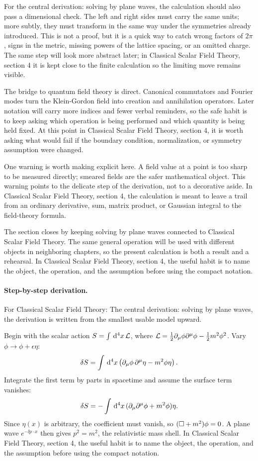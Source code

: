 For the central derivation: solving by plane waves, the calculation should also pass a dimensional check.  The left and right sides must carry the same units; more subtly, they must transform in the same way under the symmetries already introduced.  This is not a proof, but it is a quick way to catch wrong factors of \(2\pi\), signs in the metric, missing powers of the lattice spacing, or an omitted charge.  The same step will look more abstract later; in Classical Scalar Field Theory, section 4 it is kept close to the finite calculation so the limiting move remains visible.

The bridge to quantum field theory is direct.  Canonical commutators and Fourier modes turn the Klein-Gordon field into creation and annihilation operators.  Later notation will carry more indices and fewer verbal reminders, so the safe habit is to keep asking which operation is being performed and which quantity is being held fixed.  At this point in Classical Scalar Field Theory, section 4, it is worth asking what would fail if the boundary condition, normalization, or symmetry assumption were changed.

One warning is worth making explicit here.  A field value at a point is too sharp to be measured directly; smeared fields are the safer mathematical object.  This warning points to the delicate step of the derivation, not to a decorative aside.  In Classical Scalar Field Theory, section 4, the calculation is meant to leave a trail from an ordinary derivative, sum, matrix product, or Gaussian integral to the field-theory formula.

The section closes by keeping solving by plane waves connected to Classical Scalar Field Theory.  The same general operation will be used with different objects in neighboring chapters, so the present calculation is both a result and a rehearsal.  In Classical Scalar Field Theory, section 4, the useful habit is to name the object, the operation, and the assumption before using the compact notation.



\paragraph{Step-by-step derivation.}

For Classical Scalar Field Theory: The central derivation: solving by plane waves, the derivation is written from the smallest usable model upward.

Begin with the scalar action \(S=\int\,\mathrm d^4x\,\mathcal L\), where \(\mathcal L=\frac12\partial_\mu\phi\partial^\mu\phi-\frac12m^2\phi^2\).  Vary \(\phi\to\phi+\epsilon\eta\):
\[
  \delta S=\int\,\mathrm d^4x\left(\partial_\mu\phi\,\partial^\mu\eta-m^2\phi\eta\right).
\]
Integrate the first term by parts in spacetime and assume the surface term vanishes:
\[
  \delta S=-\int\,\mathrm d^4x\,(\partial_\mu\partial^\mu\phi+m^2\phi)\eta.
\]
Since \(\eta(x)\) is arbitrary, the coefficient must vanish, so \((\Box+m^2)\phi=0\).  A plane wave \(e^{-\ii p\cdot x}\) then gives \(p^2=m^2\), the relativistic mass shell.  In Classical Scalar Field Theory, section 4, the useful habit is to name the object, the operation, and the assumption before using the compact notation.


